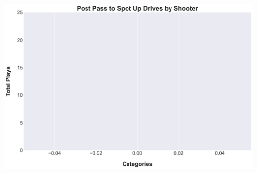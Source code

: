 \documentclass[a4paper,12pt]{article}
\begin{document}
\begin{table}[H]
{\begin{minipage}[t]{0.6\textwidth}
{\begin{tabular}
                
            
                
            
                
            
                
            
                
            
                
            
                
            
                
            
                
            
                
            
                
            
                
            
                
            
                
            
                
            
                
            
                
            
                
            
                
            
                
            

            \bottomrule
        \end{tabular}
        } %
    \end{minipage}
    } %
    \hfill %
    \begin{minipage}[c]{0.35\textwidth} %
        \flushright
        \includegraphics[width=\textwidth, height=.14\textheight]{images/Post_PassDrivesPlayer_Freq.png} %
    \end{minipage}
\end{table}
\end{document}
